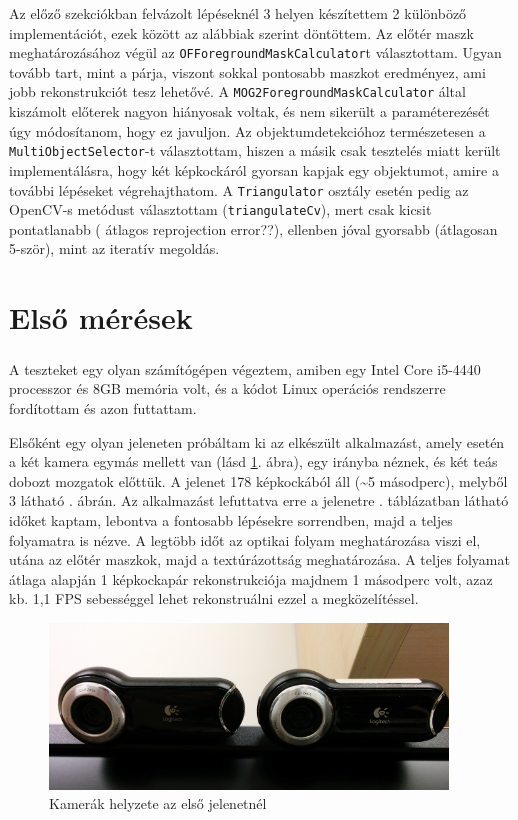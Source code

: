 Az előző szekciókban felvázolt lépéseknél 3 helyen készítettem 2 különböző implementációt, ezek között az alábbiak szerint döntöttem. Az előtér maszk meghatározásához végül az \texttt{OFForegroundMaskCalculator}t választottam. Ugyan tovább tart, mint a párja, viszont sokkal pontosabb maszkot eredményez, ami jobb rekonstrukciót tesz lehetővé. A \texttt{MOG2ForegroundMaskCalculator} által kiszámolt előterek nagyon hiányosak voltak, és nem sikerült a paraméterezését úgy módosítanom, hogy ez javuljon. Az objektumdetekcióhoz természetesen a \texttt{MultiObjectSelector}-t választottam, hiszen a másik csak tesztelés miatt került implementálásra, hogy két képkockáról gyorsan kapjak egy objektumot, amire a további lépéseket végrehajthatom. A \texttt{Triangulator} osztály esetén pedig az OpenCV-s metódust választottam (\texttt{triangulateCv}), mert csak kicsit pontatlanabb ({\color{red} átlagos reprojection error??}), ellenben jóval gyorsabb (átlagosan 5-ször), mint az iteratív megoldás.


\section{Első mérések}

A teszteket egy olyan számítógépen végeztem, amiben egy Intel\textsuperscript{\textregistered} Core\texttrademark{} i5-4440 processzor és 8GB memória volt, és a kódot Linux operációs rendszerre fordítottam és azon futtattam.

Elsőként egy olyan jeleneten próbáltam ki az elkészült alkalmazást, amely esetén a két kamera egymás mellett van (lásd \ref{fig:scene1_camerapose}. ábra), egy irányba néznek, és két teás dobozt mozgatok előttük. A jelenet 178 képkockából áll (\textasciitilde 5 másodperc), melyből 3 látható . ábrán. Az alkalmazást lefuttatva erre a jelenetre . táblázatban látható időket kaptam, lebontva a fontosabb lépésekre sorrendben, majd a teljes folyamatra is nézve. A legtöbb időt az optikai folyam meghatározása viszi el, utána az előtér maszkok, majd a textúrázottság meghatározása. A teljes folyamat átlaga alapján 1 képkockapár rekonstrukciója majdnem 1 másodperc volt, azaz kb. 1,1 FPS sebességgel lehet rekonstruálni ezzel a megközelítéssel.

\begin{figure}[tbh]
\centering
\includegraphics[width=300pt]{figures/scene1_camerapose.jpg}
\caption{Kamerák helyzete az első jelenetnél \label{fig:scene1_camerapose}}
\end{figure}


